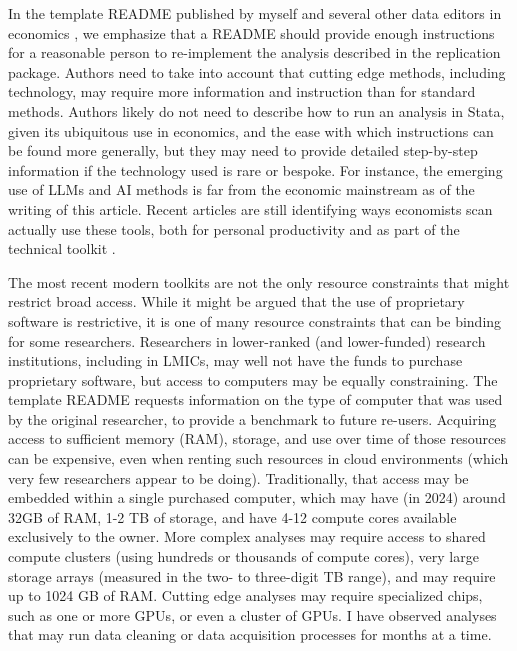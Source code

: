 \documentclass{article}
\begin{document}
In the template README published by myself and several other data editors in economics \parencite{templateREADMEv1.1}, we emphasize that a README should provide enough instructions for a reasonable person to re-implement the analysis described in the replication package. Authors need to take into account that cutting edge methods, including technology, may require more information and instruction than for standard methods. Authors likely do not need to describe how to run an analysis in Stata, given its ubiquitous use in economics, and the ease with which instructions can be found more generally, but they may need to provide detailed step-by-step information if the technology used is rare or bespoke. For instance, the emerging use of \acp{LLM} and \ac{AI} methods is far from the economic mainstream as of the writing of this article. Recent articles are still identifying ways economists scan actually use these tools, both for personal productivity \parencite{korinek_generative_2023} and as part of the technical toolkit \parencite{athey_machine_2019,dell_deep_2024}. 

The most recent modern toolkits are not the only resource constraints that might restrict broad access. While it might be argued that the use of proprietary software is restrictive, it is one of many resource constraints that can be binding for some researchers. Researchers in lower-ranked (and lower-funded) research institutions, including in \acp{LMIC}, may well not have the funds to purchase proprietary software, but access to computers may be equally constraining. The template README requests information on the type of computer that was used by the original researcher, to provide a benchmark to future re-users. Acquiring access to sufficient memory (\ac{RAM}), storage, and use over time of those resources can be expensive, even when renting such resources in cloud environments (which very few researchers appear to be doing). Traditionally, that access may be embedded within a single purchased computer, which may have (in 2024) around 32GB of RAM, 1-2 TB of storage, and have 4-12 compute cores available exclusively to the owner. More complex analyses may require access to shared compute clusters (using hundreds or thousands of compute cores), very large storage arrays (measured in the two- to three-digit TB range), and may require up to 1024 GB of RAM. Cutting edge analyses may require specialized chips, such as one or more \acp{GPU}, or even a cluster of \acp{GPU}. I have observed analyses that may run data cleaning or data acquisition processes for months at a time. 
\end{document}
